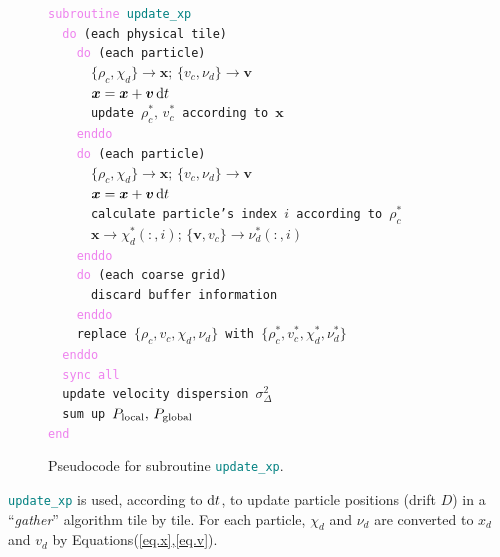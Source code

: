 \documentclass[10pt,twocolumn,preprint]{emulateapj}
\newcommand{\bs}{\boldsymbol}
\newcommand{\tcv}{\textcolor{violet}}
\newcommand{\tcx}{\textcolor{teal}}
\begin{document}
\begin{figure}[t]
{\tt \tcv{subroutine} \tcx{update\_xp}\\
\indent \ \ \tcv{do} (each physical tile)\\
\indent \ \ \ \ \tcv{do} (each particle)\\
\indent \ \ \ \ \ \ $\{\rho_c,\chi_d\}\rightarrow {\bs x};\,\{v_c,\nu_d\}\rightarrow {\bs v}$\\
\indent \ \ \ \ \ \ ${\bs x}={\bs x}+{\bs v}\,{\rm d}t$\\
\indent \ \ \ \ \ \ update $\rho_c^*,\,v_c^*$ according to ${\bs x}$\\
\indent \ \ \ \ \tcv{enddo}\\
\indent \ \ \ \ \tcv{do} (each particle)\\
\indent \ \ \ \ \ \ $\{\rho_c,\chi_d\}\rightarrow {\bs x};\,\{v_c,\nu_d\}\rightarrow {\bs v}$\\
\indent \ \ \ \ \ \ ${\bs x}={\bs x}+{\bs v}\,{\rm d}t$\\
\indent \ \ \ \ \ \ calculate particle's index $i$ according to $\rho_c^*$\\
\indent \ \ \ \ \ \ ${\bs x}\rightarrow\chi_d^*(:,i);\,\{{\bs v},v_c\}\rightarrow\nu_d^*(:,i)$\\
\indent \ \ \ \ \tcv{enddo}\\
\indent \ \ \ \ \tcv{do} (each coarse grid)\\
\indent \ \ \ \ \ \ discard buffer information\\
\indent \ \ \ \ \tcv{enddo}\\
\indent \ \ \ \ replace $\{\rho_c,v_c,\chi_d,\nu_d\}$ with $\{\rho_c^*,v_c^*,\chi_d^*,\nu_d^*\}$\\
\indent \ \ \tcv{enddo}\\
\indent \ \ \tcv{sync all}\\
\indent \ \ update velocity dispersion $\sigma^2_{\Delta}$\\
\indent \ \ sum up $P_{\rm local},\,P_{\rm global}$\\
\tcv{end}\\}
\caption{Pseudocode for subroutine {\tt \tcx{update\_xp}}.}
\label{fig.update_xp}
\end{figure}


{\tt \tcx{update\_xp}}
is used, according to ${\rm d}t$, to update particle positions (drift $D$) in a ``{\it gather}'' algorithm tile by tile. For each particle, $\chi_d$ and $\nu_d$ are converted to $x_d$ and $v_d$ by Equations(\ref{eq.x},\ref{eq.v}).
\end{document}

